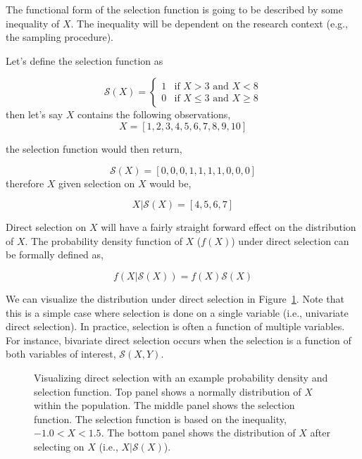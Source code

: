 \documentclass[
  letterpaper,
  DIV=11,
  numbers=noendperiod]{scrreprt}
\begin{document}
The functional form of the selection function is going to be described
by some inequality of \(X\). The inequality will be dependent on the
research context (e.g., the sampling procedure).

\begin{tcolorbox}[enhanced jigsaw, opacityback=0, coltitle=black, toprule=.15mm, colframe=quarto-callout-tip-color-frame, bottomtitle=1mm, rightrule=.15mm, colbacktitle=quarto-callout-tip-color!10!white, left=2mm, bottomrule=.15mm, breakable, title={A Simple Example}, colback=white, opacitybacktitle=0.6, titlerule=0mm, arc=.35mm, leftrule=.75mm, toptitle=1mm]

Let's define the selection function as

\[\mathcal{S}(X) = \begin{cases}1 & \text{if }X>3 \text{ and } X<8 \\ 0 & \text{if }X\leq3 \text{ and } X\geq8  \end{cases}\]
then let's say \(X\) contains the following observations, \[
X = [1,2,3,4,5,6,7,8,9,10]
\]

the selection function would then return,

\[
\mathcal{S}(X) =  [0,0,0,1,1,1,1,0,0,0]
\] therefore \(X\) given selection on \(X\) would be,

\[
X|\mathcal{S}(X) =  [4,5,6,7]
\]

\end{tcolorbox}

Direct selection on \(X\) will have a fairly straight forward effect on
the distribution of \(X\). The probability density function of \(X\)
(\(f(X)\)) under direct selection can be formally defined as,

\[
f\left(X|\mathcal{S}(X)\right) = f(X) \mathcal{S}(X)
\]

We can visualize the distribution under direct selection in
Figure~\ref{fig-pdf}. Note that this is a simple case where selection is
done on a single variable (i.e., univariate direct selection). In
practice, selection is often a function of multiple variables. For
instance, bivariate direct selection occurs when the selection is a
function of both variables of interest, \(\mathcal{S}(X,Y)\).

\begin{figure}[H]


\caption{\label{fig-pdf}Visualizing direct selection with an example
probability density and selection function. Top panel shows a normally
distribution of \(X\) within the population. The middle panel shows the
selection function. The selection function is based on the inequality,
\(-1.0<X<1.5\). The bottom panel shows the distribution of \(X\) after
selecting on \(X\) (i.e., \(X|\mathcal{S}(X)\)).}

\end{figure}%
\end{document}
